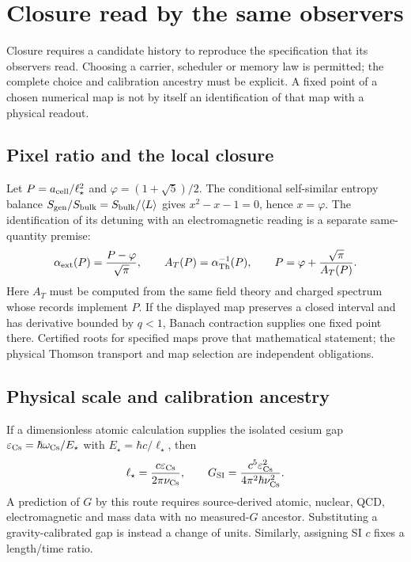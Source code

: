\documentclass[11pt]{article}
\begin{document}


\section{Closure read by the same observers}
\label{sec:closure-equations}

Closure requires a candidate history to reproduce the specification that
its observers read. Choosing a carrier, scheduler or memory law is permitted;
the complete choice and calibration ancestry must be explicit. A fixed point
of a chosen numerical map is not by itself an identification of that map
with a physical readout.

\subsection{Pixel ratio and the local closure}
\label{sec:p-closure}
Let $P=a_{\rm cell}/\ell_\star^2$ and
$\varphi=(1+\sqrt5)/2$. The conditional self-similar entropy balance
$S_{\rm gen}/S_{\rm bulk}=S_{\rm bulk}/\langle L\rangle$ gives
$x^2-x-1=0$, hence $x=\varphi$. The identification of its detuning with
an electromagnetic reading is a separate same-quantity premise:
\[
 \alpha_{\rm ext}(P)=\frac{P-\varphi}{\sqrt\pi},\qquad
 A_T(P)=\alpha_{\rm Th}^{-1}(P),\qquad
 P=\varphi+\frac{\sqrt\pi}{A_T(P)}.
\]
Here $A_T$ must be computed from the same field theory and charged spectrum
whose records implement $P$. If the displayed map preserves a closed
interval and has derivative bounded by $q<1$, Banach contraction supplies
one fixed point there. Certified roots for specified maps prove that
mathematical statement; the physical Thomson transport and map selection
are independent obligations.

\subsection{Physical scale and calibration ancestry}
If a dimensionless atomic calculation supplies the isolated cesium gap
$\varepsilon_{\rm Cs}=\hbar\omega_{\rm Cs}/E_\star$ with
$E_\star=\hbar c/\ell_\star$, then
\[
 \ell_\star=\frac{c\varepsilon_{\rm Cs}}{2\pi\nu_{\rm Cs}},\qquad
 G_{\rm SI}=\frac{c^5\varepsilon_{\rm Cs}^2}
 {4\pi^2\hbar\nu_{\rm Cs}^2}.
\]
A prediction of $G$ by this route requires source-derived atomic, nuclear,
QCD, electromagnetic and mass data with no measured-$G$ ancestor. Substituting
a gravity-calibrated gap is instead a change of units. Similarly, assigning
SI $c$ fixes a length/time ratio.
\end{document}
